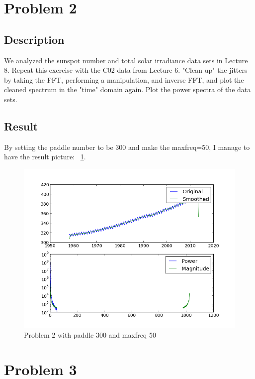 \documentclass[11pt,letterpaper]{article}
\begin{document}
\section{Problem 2}

\subsection{Description}

We analyzed the sunspot number and total solar irradiance data sets in Lecture 8. Repeat this exercise with the C02 data from Lecture 6. "Clean up" the jitters by taking the FFT, performing a manipulation, and inverse FFT, and plot the cleaned spectrum in the "time" domain again. Plot the power spectra of the data sets. 

\subsection{Result}
By setting the paddle number to be 300 and make the maxfreq=50, I manage to have the result picture: ~\ref{figure2}.



\begin{figure}
\begin{center}
\includegraphics[width=0.9\linewidth,angle=0]{p2.png}
\caption{Problem 2 with paddle 300 and maxfreq 50}
\label{figure2}
\end{center}
\end{figure}



\section{Problem 3}
\end{document}
